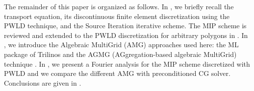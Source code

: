 The remainder of this paper is organized as follows. In ,
we briefly recall the \sn transport equation, its discontinuous finite element
discretization using the PWLD technique, and the Source Iteration iterative scheme. 
The MIP scheme is reviewed and extended to the PWLD discretization for arbitrary 
polygons in . In , we introduce the Algebraic MultiGrid (AMG) 
approaches used here: the ML package of Trilinos \cite{ml_guide} and the
AGMG (AGgregation-based algebraic MultiGrid) technique \cite{agmg_guide}. In
, we present a Fourier analysis for the MIP scheme discretized with
PWLD and we compare the different AMG with preconditioned CG solver.
Conclusions are given in .
